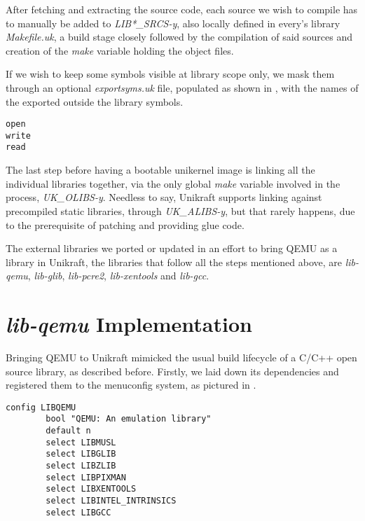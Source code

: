 After fetching and extracting the source code, each source we wish to compile has to manually be added to \textit{LIB*_SRCS-y}, also locally defined in every's library \textit{Makefile.uk}, a build stage closely followed by the compilation of said sources and creation of the \textit{make} variable holding the object files.

If we wish to keep some symbols visible at library scope only, we mask them through an optional \textit{exportsyms.uk} file, populated as shown in , with the names of the exported outside the library symbols.

\begin{lstlisting}
open
write
read
\end{lstlisting}

The last step before having a bootable unikernel image is linking all the individual libraries together, via the only global \textit{make} variable involved in the process, \textit{UK_OLIBS-y}.
Needless to say, Unikraft supports linking against precompiled static libraries, through \textit{UK_ALIBS-y}, but that rarely happens, due to the prerequisite of patching and providing glue code.

The external libraries we ported or updated in an effort to bring QEMU as a library in Unikraft, the libraries that follow all the steps mentioned above, are \textit{lib-qemu}, \textit{lib-glib}, \textit{lib-pcre2}, \textit{lib-xentools} and \textit{lib-gcc}.

\section{\textit{lib-qemu} Implementation}
\label{sec:lib-qemu-impl}

Bringing QEMU to Unikraft mimicked the usual build lifecycle of a C/C++ open source library, as described before.
Firstly, we laid down its dependencies and registered them to the menuconfig system, as pictured in .

\begin{lstlisting}
config LIBQEMU
        bool "QEMU: An emulation library"
        default n
        select LIBMUSL
        select LIBGLIB
        select LIBZLIB
        select LIBPIXMAN
        select LIBXENTOOLS
        select LIBINTEL_INTRINSICS
        select LIBGCC
\end{lstlisting}

